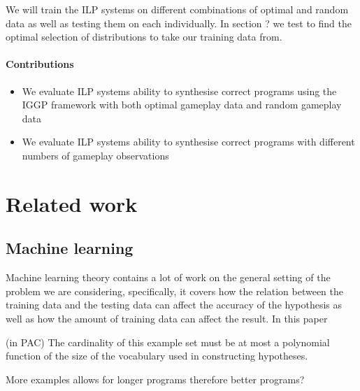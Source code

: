 \documentclass[a4paper,12pt]{report}
\begin{document}
We will train the ILP systems on different combinations of optimal and random data as well as testing them on each individually. In section ? we test to find the optimal selection of distributions to take our training data from.

\subsubsection{Contributions}
\begin{itemize}
\item We evaluate ILP systems ability to synthesise correct programs using the IGGP framework with both optimal gameplay data and random gameplay data
\item We evaluate ILP systems ability to synthesise correct programs with different numbers of gameplay observations
\end{itemize}

\chapter{Related work}
\section{Machine learning}
Machine learning theory contains a lot of work on the general setting of the problem we are considering, specifically, it covers how the relation between the training data and the testing data can affect the accuracy of the hypothesis as well as how the amount of training data can affect the result. In this paper 

(in PAC) The cardinality of this example set must be at most a polynomial function of the size of the vocabulary used in constructing hypotheses.

More examples allows for longer programs therefore better programs?
\end{document}
